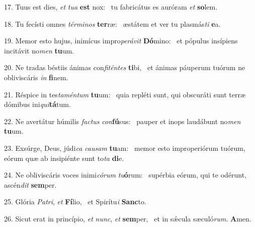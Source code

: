 17. Tuus est dies, \textit{et} \textit{tu}\textit{a} \textbf{est} nox: \ast\  tu fabricátus es auróram \textit{et} \textbf{so}lem.\

18. Tu fecísti omnes \textit{tér}\textit{mi}\textit{nos} \textbf{ter}ræ: \ast\  æstátem et ver tu plasmás\textit{ti} \textbf{e}a.\

19. Memor esto hujus, inimícus impro\textit{pe}\textit{rá}\textit{vit} \textbf{Dó}mino: \ast\  et pópulus insípiens incitávit no\textit{men} \textbf{tu}um.\

20. Ne tradas béstiis ánimas con\textit{fi}\textit{tén}\textit{tes} \textbf{ti}bi, \ast\  et ánimas páuperum tuórum ne obliviscáris \textit{in} \textbf{fi}nem.\

21. Réspice in tes\textit{ta}\textit{mén}\textit{tum} \textbf{tu}um: \ast\  quia repléti sunt, qui obscuráti sunt terræ dómibus ini\textit{qui}\textbf{tá}tum.\

22. Ne avertátur húmilis \textit{fac}\textit{tus} \textit{con}\textbf{fú}sus: \ast\  pauper et inops laudábunt no\textit{men} \textbf{tu}um.\

23. Exsúrge, Deus, júdi\textit{ca} \textit{cau}\textit{sam} \textbf{tu}am: \ast\  memor esto improperiórum tuórum, eórum quæ ab insipiénte sunt to\textit{ta} \textbf{di}e.\

24. Ne obliviscáris voces inimi\textit{có}\textit{rum} \textit{tu}\textbf{ó}rum: \ast\  supérbia eórum, qui te odérunt, ascén\textit{dit} \textbf{sem}per.\

25. Glória \textit{Pa}\textit{tri}, \textit{et} \textbf{Fí}lio, \ast\  et Spirítu\textit{i} \textbf{Sanc}to.\

26. Sicut erat in princípio, \textit{et} \textit{nunc}, \textit{et} \textbf{sem}per, \ast\  et in sǽcula sæculó\textit{rum}. \textbf{A}men.\


